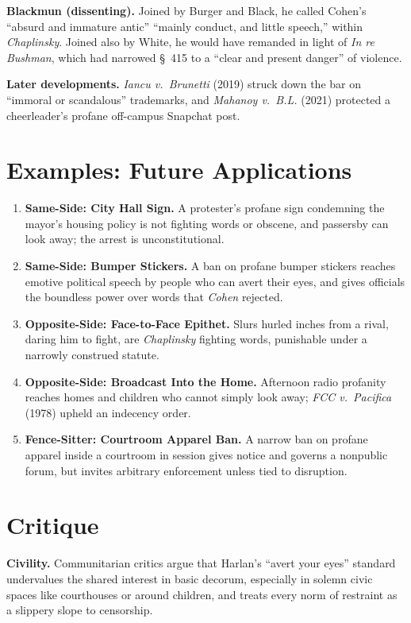 \documentclass[12pt]{article}
\begin{document}
\textbf{Blackmun (dissenting).} Joined by Burger and Black, he called Cohen's ``absurd and immature antic'' ``mainly conduct, and little speech,'' within \textit{Chaplinsky}. Joined also by White, he would have remanded in light of \textit{In re Bushman}, which had narrowed \S~415 to a ``clear and present danger'' of violence.

\textbf{Later developments.} \textit{Iancu v.\ Brunetti} (2019) struck down the bar on ``immoral or scandalous'' trademarks, and \textit{Mahanoy v.\ B.L.} (2021) protected a cheerleader's profane off-campus Snapchat post.

\section{Examples: Future Applications}

\begin{enumerate}
\item \textbf{Same-Side: City Hall Sign.} A protester's profane sign condemning the mayor's housing policy is not fighting words or obscene, and passersby can look away; the arrest is unconstitutional.
\item \textbf{Same-Side: Bumper Stickers.} A ban on profane bumper stickers reaches emotive political speech by people who can avert their eyes, and gives officials the boundless power over words that \textit{Cohen} rejected.
\item \textbf{Opposite-Side: Face-to-Face Epithet.} Slurs hurled inches from a rival, daring him to fight, are \textit{Chaplinsky} fighting words, punishable under a narrowly construed statute.
\item \textbf{Opposite-Side: Broadcast Into the Home.} Afternoon radio profanity reaches homes and children who cannot simply look away; \textit{FCC v.\ Pacifica} (1978) upheld an indecency order.
\item \textbf{Fence-Sitter: Courtroom Apparel Ban.} A narrow ban on profane apparel inside a courtroom in session gives notice and governs a nonpublic forum, but invites arbitrary enforcement unless tied to disruption.
\end{enumerate}

\section{Critique}

\textbf{Civility.} Communitarian critics argue that Harlan's ``avert your eyes'' standard undervalues the shared interest in basic decorum, especially in solemn civic spaces like courthouses or around children, and treats every norm of restraint as a slippery slope to censorship.
\end{document}
